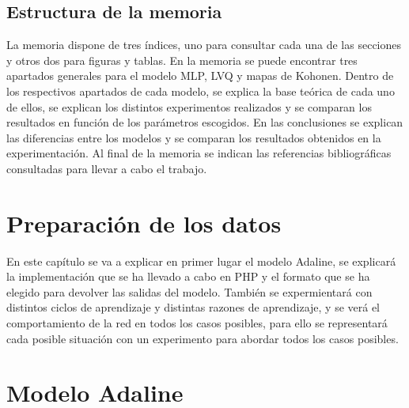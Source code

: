 \documentclass[11pt,spanish,listoffigures,listoftables]{workluis}
\begin{document}
\section{Estructura de la memoria}

\par La memoria dispone de tres índices, uno para consultar cada una de las secciones y otros dos para figuras y tablas. En la memoria se puede encontrar tres apartados generales para el modelo MLP, LVQ y mapas de Kohonen. Dentro de los respectivos apartados de cada modelo, se explica la base teórica de cada uno de ellos, se explican los distintos experimentos realizados y se comparan los resultados en función de los parámetros escogidos. En las conclusiones se explican las diferencias entre los modelos y se comparan los resultados obtenidos en la experimentación. Al final de la memoria se indican las referencias bibliográficas consultadas para llevar a cabo el trabajo.




\chapter{Preparación de los datos}

\par En este capítulo se va a explicar en primer lugar el modelo Adaline, se explicará la implementación que se ha llevado a cabo en PHP y el formato que se ha elegido para devolver las salidas del modelo. También se expermientará con distintos ciclos de aprendizaje y distintas razones de aprendizaje, y se verá el comportamiento de la red en todos los casos posibles, para ello se representará cada posible situación con un experimento para abordar todos los casos posibles.

\chapter{Modelo Adaline}
\end{document}
